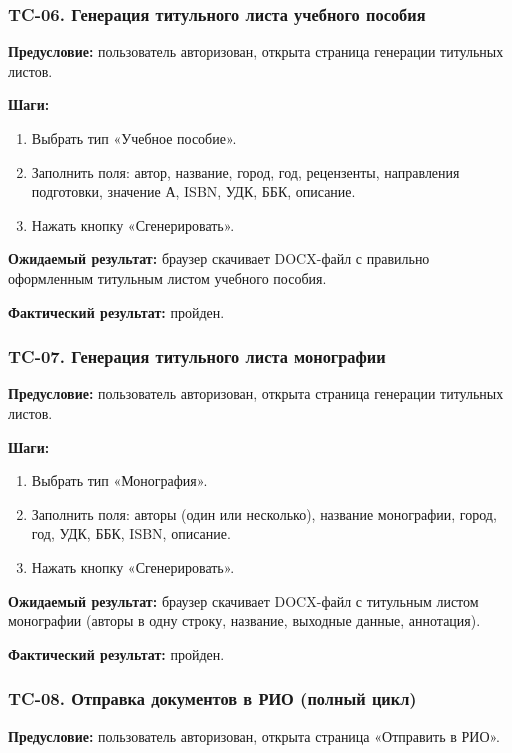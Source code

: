 \subsubsection{TC-06. Генерация титульного листа учебного пособия}

\textbf{Предусловие:} пользователь авторизован, открыта страница генерации титульных листов.

\textbf{Шаги:}
\begin{enumerate}
	\item Выбрать тип «Учебное пособие».
	\item Заполнить поля: автор, название, город, год, рецензенты, направления подготовки, значение А, ISBN, УДК, ББК, описание.
	\item Нажать кнопку «Сгенерировать».
\end{enumerate}

\textbf{Ожидаемый результат:} браузер скачивает DOCX-файл с правильно оформленным титульным листом учебного пособия.

\textbf{Фактический результат:} пройден.

\subsubsection{TC-07. Генерация титульного листа монографии}

\textbf{Предусловие:} пользователь авторизован, открыта страница генерации титульных листов.

\textbf{Шаги:}
\begin{enumerate}
	\item Выбрать тип «Монография».
	\item Заполнить поля: авторы (один или несколько), название монографии, город, год, УДК, ББК, ISBN, описание.
	\item Нажать кнопку «Сгенерировать».
\end{enumerate}

\textbf{Ожидаемый результат:} браузер скачивает DOCX-файл с титульным листом монографии (авторы в одну строку, название, выходные данные, аннотация).

\textbf{Фактический результат:} пройден.

\subsubsection{TC-08. Отправка документов в РИО (полный цикл)}

\textbf{Предусловие:} пользователь авторизован, открыта страница «Отправить в РИО».

